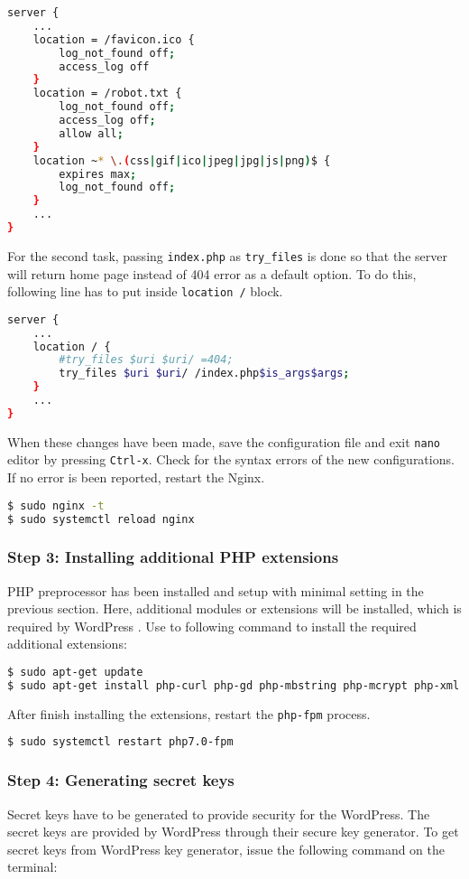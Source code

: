 \begin{lstlisting}[language=sh]
server {
	...
	location = /favicon.ico {
		log_not_found off;
		access_log off
	}
	location = /robot.txt {
		log_not_found off;
		access_log off;
		allow all;
	}
	location ~* \.(css|gif|ico|jpeg|jpg|js|png)$ {
		expires max;
		log_not_found off;
	}
	...
}
\end{lstlisting}

For the second task, passing \texttt{index.php} as \texttt{try\_files} is done so that the server will return home page instead of 404 error as a default option. To do this, following line has to put inside \texttt{location /} block.

\begin{lstlisting}[language=sh]
server {
	...
	location / {
		#try_files $uri $uri/ =404;
		try_files $uri $uri/ /index.php$is_args$args;
	}
	...
}
\end{lstlisting}

When these changes have been made, save the configuration file and exit \texttt{nano} editor by pressing \texttt{Ctrl-x}. Check for the syntax errors of the new configurations. If no error is been reported, restart the Nginx.

\begin{lstlisting}[language=sh]
$ sudo nginx -t
$ sudo systemctl reload nginx
\end{lstlisting}

\subsubsection*{Step 3: Installing additional PHP extensions}
PHP preprocessor has been installed and setup with minimal setting in the previous section. Here, additional modules or extensions will be installed, which is required by WordPress \cite{SugarHill.2016}. Use to following command to install the required additional extensions:

\begin{lstlisting}[language=sh]
$ sudo apt-get update
$ sudo apt-get install php-curl php-gd php-mbstring php-mcrypt php-xml php-xmlrpc
\end{lstlisting}

After finish installing the extensions, restart the \texttt{php-fpm} process.
\begin{lstlisting}[language=sh]
$ sudo systemctl restart php7.0-fpm
\end{lstlisting}

\subsubsection*{Step 4: Generating secret keys}
Secret keys have to be generated to provide security for the WordPress. The secret keys are provided by WordPress through their secure key generator. To get secret keys from WordPress key generator, issue the following command on the terminal:

